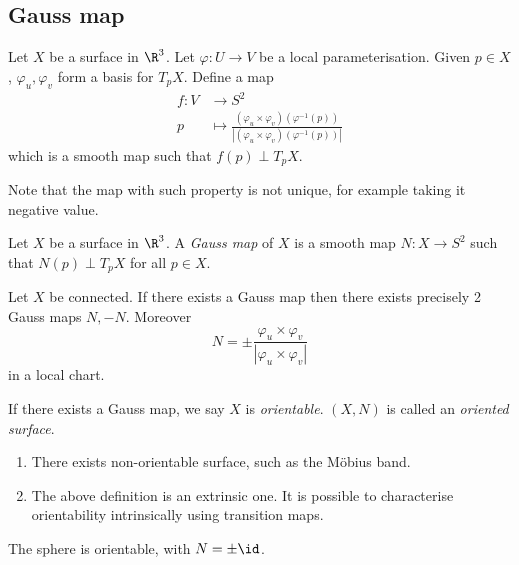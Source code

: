 \documentclass[a4paper]{article}
\begin{document}
\subsection{Gauss map}

Let \(X\) be a surface in \(\R^3\). Let \(\varphi: U \to V\) be a local parameterisation. Given \(p \in X\), \(\varphi_u, \varphi_v\) form a basis for \(T_pX\). Define a map
\begin{align*}
  f: V &\to S^2 \\
  p &\mapsto \frac{(\varphi_u \times \varphi_v)(\varphi^{-1}(p))}{|(\varphi_u \times \varphi_v)(\varphi^{-1}(p))|}
\end{align*}
which is a smooth map such that \(f(p) \perp T_pX\).

Note that the map with such property is not unique, for example taking it negative value.

\begin{definition}
  Let \(X\) be a surface in \(\R^3\). A \emph{Gauss map} of \(X\) is a smooth map \(N: X \to S^2\) such that \(N(p) \perp T_pX\) for all \(p \in X\).
\end{definition}

\begin{note}
  Let \(X\) be connected. If there exists a Gauss map then there exists precisely 2 Gauss maps \(N, -N\). Moreover
  \[
    N = \pm \frac{\varphi_u \times \varphi_v}{|\varphi_u \times \varphi_v|}
  \]
  in a local chart.
\end{note}

\begin{definition}[Orientability]
  If there exists a Gauss map, we say \(X\) is \emph{orientable}. \((X, N)\) is called an \emph{oriented surface}.
\end{definition}

\begin{remark}\leavevmode
  \begin{enumerate}
  \item There exists non-orientable surface, such as the Möbius band.
  \item The above definition is an extrinsic one. It is possible to characterise orientability intrinsically using transition maps.
  \end{enumerate}
\end{remark}

\begin{eg}
  The sphere is orientable, with \(N = \pm \id\).
\end{eg}
\end{document}
